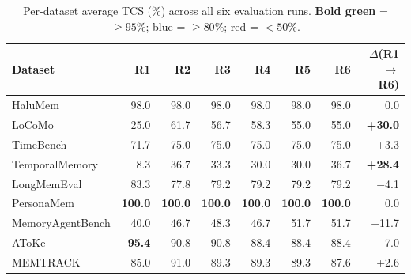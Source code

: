 \documentclass[11pt,a4paper]{article}
\begin{document}
\begin{table}[H]
\centering
\caption{Per-dataset average TCS (\%) across all six evaluation runs.
\textcolor{passgreen}{\textbf{Bold green}} = $\geq 95\%$;
\textcolor{nearblue}{blue} = $\geq 80\%$;
\textcolor{failred}{red} = $< 50\%$.}
\label{tab:full-results}
\small
\setlength{\tabcolsep}{4pt}
\begin{tabular}{l*{6}{r}r}
\toprule
\textbf{Dataset} & \textbf{R1} & \textbf{R2} & \textbf{R3} & \textbf{R4} & \textbf{R5} & \textbf{R6} & \textbf{$\Delta$(R1$\to$R6)} \\
\midrule
HaluMem
    & \textcolor{nearblue}{98.0}
    & \textcolor{nearblue}{98.0}
    & \textcolor{nearblue}{98.0}
    & \textcolor{nearblue}{98.0}
    & \textcolor{nearblue}{98.0}
    & \textcolor{nearblue}{98.0}
    & 0.0 \\
LoCoMo
    & \textcolor{failred}{25.0}
    & 61.7
    & 56.7
    & 58.3
    & 55.0
    & 55.0
    & \textbf{+30.0} \\
TimeBench
    & 71.7
    & 75.0
    & 75.0
    & 75.0
    & 75.0
    & 75.0
    & +3.3 \\
TemporalMemory
    & \textcolor{failred}{8.3}
    & \textcolor{failred}{36.7}
    & \textcolor{failred}{33.3}
    & \textcolor{failred}{30.0}
    & \textcolor{failred}{30.0}
    & \textcolor{failred}{36.7}
    & \textbf{+28.4} \\
LongMemEval
    & \textcolor{nearblue}{83.3}
    & 77.8
    & 79.2
    & 79.2
    & 79.2
    & 79.2
    & $-$4.1 \\
PersonaMem
    & \textcolor{passgreen}{\textbf{100.0}}
    & \textcolor{passgreen}{\textbf{100.0}}
    & \textcolor{passgreen}{\textbf{100.0}}
    & \textcolor{passgreen}{\textbf{100.0}}
    & \textcolor{passgreen}{\textbf{100.0}}
    & \textcolor{passgreen}{\textbf{100.0}}
    & 0.0 \\
MemoryAgentBench
    & \textcolor{failred}{40.0}
    & \textcolor{failred}{46.7}
    & \textcolor{failred}{48.3}
    & \textcolor{failred}{46.7}
    & 51.7
    & 51.7
    & +11.7 \\
AToKe
    & \textcolor{passgreen}{\textbf{95.4}}
    & 90.8
    & 90.8
    & \textcolor{nearblue}{88.4}
    & \textcolor{nearblue}{88.4}
    & \textcolor{nearblue}{88.4}
    & $-$7.0 \\
MEMTRACK
    & \textcolor{nearblue}{85.0}
    & \textcolor{nearblue}{91.0}
    & \textcolor{nearblue}{89.3}
    & \textcolor{nearblue}{89.3}
    & \textcolor{nearblue}{89.3}
    & \textcolor{nearblue}{87.6}
    & +2.6 \\

\end{tabular}
\end{table}
\end{document}
